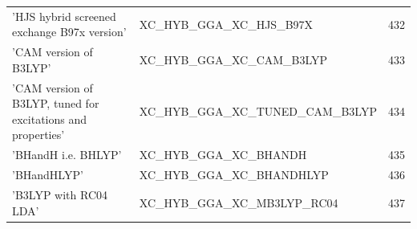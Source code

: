 \documentclass[final,12pt,makeidx,DIV=calc]{article}
\begin{document}
{{{{{{\begin{table}[!h]
\begin{center}
\begin{tabular}{llr}
  'HJS hybrid screened exchange B97x version' & XC\_HYB\_GGA\_XC\_HJS\_B97X  &432\\
  'CAM version of B3LYP' & XC\_HYB\_GGA\_XC\_CAM\_B3LYP  &433\\
  'CAM version of B3LYP, tuned for excitations and properties' & XC\_HYB\_GGA\_XC\_TUNED\_CAM\_B3LYP  &434\\
  'BHandH i.e. BHLYP' & XC\_HYB\_GGA\_XC\_BHANDH  &435\\
  'BHandHLYP' & XC\_HYB\_GGA\_XC\_BHANDHLYP  &436\\
  'B3LYP with RC04 LDA' & XC\_HYB\_GGA\_XC\_MB3LYP\_RC04  &437\\
\end{tabular}
\end{center}
\end{table}

}}}}}}
\end{document}
